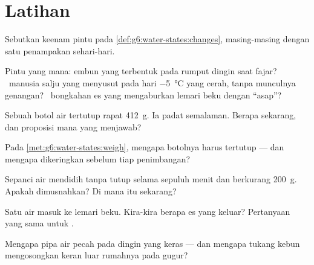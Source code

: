 \section{Latihan}

\begin{exercise}[$\star$]\label{exo:g6:water-states:1}
Sebutkan keenam pintu pada \cref{def:g6:water-states:changes},
masing-masing dengan satu penampakan sehari-hari.
\end{exercise}

\begin{exercise}[$\star$]\label{exo:g6:water-states:2}
Pintu yang mana: embun yang terbentuk pada rumput dingin saat fajar?
\ manusia salju yang menyusut pada hari \qty{-5}{\celsius} yang cerah,
tanpa munculnya genangan? \ bongkahan es yang mengaburkan lemari beku
dengan ``asap''?
\end{exercise}

\begin{exercise}[$\star$]\label{exo:g6:water-states:3}
Sebuah botol air tertutup rapat  \qty{412}{g}. Ia 
padat semalaman. Berapa  sekarang, dan proposisi mana yang
menjawab?
\end{exercise}

\begin{exercise}[$\star$]\label{exo:g6:water-states:4}
Pada \cref{met:g6:water-states:weigh}, mengapa botolnya harus tertutup
--- dan mengapa dikeringkan sebelum tiap penimbangan?
\end{exercise}

\begin{exercise}[$\star$]\label{exo:g6:water-states:5}
Sepanci air mendidih tanpa tutup selama sepuluh menit dan 
berkurang \qty{200}{g}. Apakah  dimusnahkan? Di mana  itu
sekarang?
\end{exercise}

\begin{exercise}[$\star$]\label{exo:g6:water-states:6}
Satu  air masuk ke lemari beku. Kira-kira berapa  es yang
keluar? Pertanyaan yang sama untuk .
\end{exercise}

\begin{exercise}[$\star$]\label{exo:g6:water-states:7}
Mengapa pipa air pecah pada  dingin yang keras --- dan mengapa
tukang kebun mengosongkan keran luar rumahnya pada  gugur?
\end{exercise}

